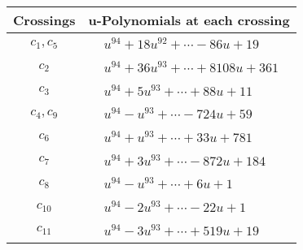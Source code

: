 \documentclass[1p]{elsarticle_modified}
\theoremstyle{definition}
\begin{document}
\begin{tabular}{m{50pt}|m{274pt}}
Crossings & \hspace{64pt}u-Polynomials at each crossing \\
\hline $$\begin{aligned}c_{1},c_{5}\end{aligned}$$&$\begin{aligned}
&u^{94}+18 u^{92}+\cdots-86 u+19
\end{aligned}$\\
\hline $$\begin{aligned}c_{2}\end{aligned}$$&$\begin{aligned}
&u^{94}+36 u^{93}+\cdots+8108 u+361
\end{aligned}$\\
\hline $$\begin{aligned}c_{3}\end{aligned}$$&$\begin{aligned}
&u^{94}+5 u^{93}+\cdots+88 u+11
\end{aligned}$\\
\hline $$\begin{aligned}c_{4},c_{9}\end{aligned}$$&$\begin{aligned}
&u^{94}- u^{93}+\cdots-724 u+59
\end{aligned}$\\
\hline $$\begin{aligned}c_{6}\end{aligned}$$&$\begin{aligned}
&u^{94}+u^{93}+\cdots+33 u+781
\end{aligned}$\\
\hline $$\begin{aligned}c_{7}\end{aligned}$$&$\begin{aligned}
&u^{94}+3 u^{93}+\cdots-872 u+184
\end{aligned}$\\
\hline $$\begin{aligned}c_{8}\end{aligned}$$&$\begin{aligned}
&u^{94}- u^{93}+\cdots+6 u+1
\end{aligned}$\\
\hline $$\begin{aligned}c_{10}\end{aligned}$$&$\begin{aligned}
&u^{94}-2 u^{93}+\cdots-22 u+1
\end{aligned}$\\
\hline $$\begin{aligned}c_{11}\end{aligned}$$&$\begin{aligned}
&u^{94}-3 u^{93}+\cdots+519 u+19
\end{aligned}$\\
\hline
\end{tabular}\\~\\
\end{document}
